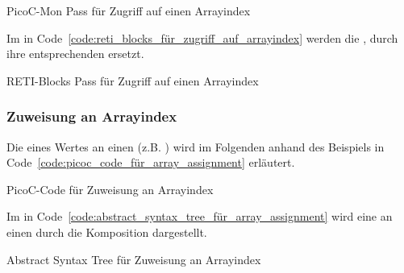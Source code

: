 \begin{code}
  \centering
  \caption{PicoC-Mon Pass für Zugriff auf einen Arrayindex}
  \label{code:picoc_mon_für_zugriff_auf_arrayindex}
\end{code}

Im  in Code~\ref{code:reti_blocks_für_zugriff_auf_arrayindex} werden die  ,  durch ihre entsprechenden  ersetzt.

\begin{code}
  \centering
  \caption{RETI-Blocks Pass für Zugriff auf einen Arrayindex}
  \label{code:reti_blocks_für_zugriff_auf_arrayindex}
\end{code}

\subsubsection{Zuweisung an Arrayindex}

Die  eines Wertes an einen  (z.B. ) wird im Folgenden anhand des Beispiels in Code~\ref{code:picoc_code_für_array_assignment} erläutert.

\begin{code}
  \centering
  \caption{PicoC-Code für Zuweisung an Arrayindex}
  \label{code:picoc_code_für_array_assignment}
\end{code}

Im  in Code~\ref{code:abstract_syntax_tree_für_array_assignment} wird eine  an einen   durch die Komposition  dargestellt.

\begin{code}
  \centering
  \caption{Abstract Syntax Tree für Zuweisung an Arrayindex}
  \label{code:abstract_syntax_tree_für_array_assignment}
\end{code}

